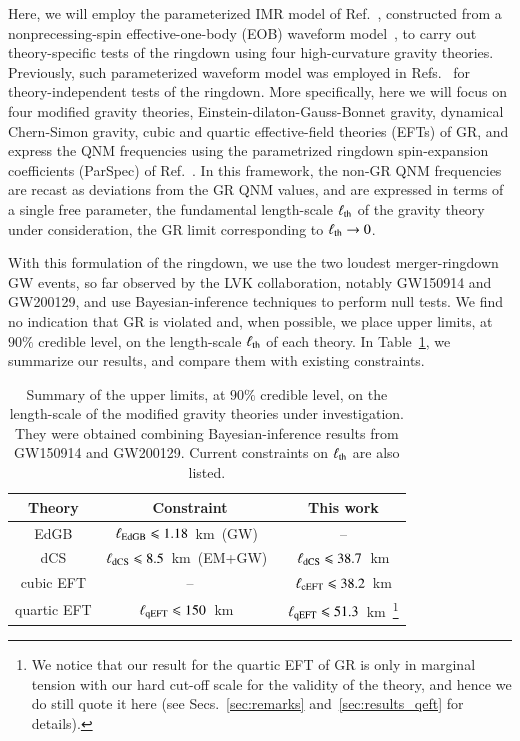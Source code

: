 \documentclass[twocolumn,
               prd,
               aps,
               superscriptaddress,
               tightenlines,
               nofootinbib,
               eqsecnum,
               amsfonts,
               amsmath,
               longbibliography]{revtex4-1}
\begin{document}
Here, we will employ the parameterized IMR model of Ref.~\cite{Ghosh:2021mrv}, constructed from a nonprecessing-spin effective-one-body (EOB) waveform model~\cite{Bohe:2016gbl,Cotesta:2018fcv,Mihaylov:2021bpf}, to carry out theory-specific tests of the
ringdown using four high-curvature gravity theories. Previously, such parameterized
waveform model was employed in Refs.~\cite{Abbott:2020jks,LIGOScientific:2021sio} for theory-independent tests of the ringdown.
%
More specifically, here we will focus on four modified gravity theories, Einstein-dilaton-Gauss-Bonnet gravity, dynamical
Chern-Simon gravity, cubic and quartic effective-field theories (EFTs) of GR, and
express the QNM frequencies using the parametrized ringdown spin-expansion coefficients (ParSpec)
of Ref.~\cite{Maselli:2019mjd}.
%
In this framework, the non-GR QNM frequencies are
recast as deviations from the GR QNM values, and are expressed in terms of a single free parameter,
the fundamental length-scale $\ell_{\rm th}$ of the gravity theory under consideration, the GR limit
corresponding to $\ell_{\rm th} \rightarrow 0$.

With this formulation of the ringdown, we use the two loudest merger-ringdown GW events, so far
observed by the LVK collaboration, notably GW150914 and GW200129, and use Bayesian-inference techniques to
perform null tests. We find no indication that GR is violated and, when possible, we place upper limits, at $90\%$ credible level,
on the length-scale $\ell_{\rm th}$ of each theory. In Table~\ref{tab:bound_summary}, we summarize our results, and compare
them with existing constraints.

\begin{table}[t]
\begin{tabular}{c | c c}
\hline \hline
Theory & Constraint & This work \\
\hline
EdGB        & $\ell_{\rm EdGB} \leqslant 1.18$~km~(GW)~\cite{Lyu:2022gdr} & -- \\
dCS         & $\ell_{\rm dCS} \leqslant 8.5$~km~(EM+GW)~\cite{Silva:2020acr}  & $\ell_{\rm dCS} \leqslant 38.7$~km \\
cubic EFT   & -- & $\ell_{\rm cEFT} \leqslant 38.2$~km \\
quartic EFT & $\ell_{\rm qEFT} \leqslant 150$~km~\cite{Sennett:2019bpc}  & $\ell_{\rm qEFT} \leqslant 51.3$~km~\footnote{We notice that our result for the quartic EFT of GR is only in marginal tension with our hard cut-off scale for the
validity of the theory, and hence we do still quote it here (see Secs.~\ref{sec:remarks} and~\ref{sec:results_qeft}
for details).}
\\
\hline \hline
\end{tabular}
\caption{Summary of the upper limits, at $90\%$ credible level,
on the length-scale of the modified gravity theories under investigation.
They were obtained combining Bayesian-inference results from GW150914 and GW200129.
Current constraints on $\ell_{\rm th}$ are also listed.}
\label{tab:bound_summary}
\end{table}
\end{document}
